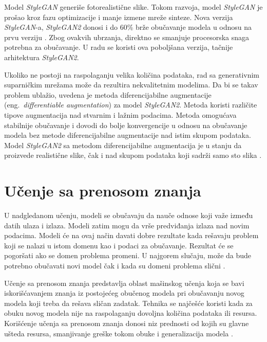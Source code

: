 \documentclass[12pt,oneside]{memoir}
\begin{document}
Model \textit{StyleGAN} generiše fotorealistične slike. Tokom razvoja, model \textit{StyleGAN} je prošao kroz fazu optimizacije i manje izmene mreže sinteze. Nova verzija \textit{StyleGAN}-a, \textit{StyleGAN2} donosi i do 60\% brže obučavanje modela u odnosu na prvu verziju \cite{karras2020analyzing}. Zbog ovakvih ubrzanja, direktno se smanjuje procesorska snaga potrebna za obučavanje. U radu se koristi ova poboljšana verzija, tačnije arhitektura \textit{StyleGAN2}.

Ukoliko ne postoji na raspolaganju velika količina podataka, rad sa generativnim suparničkim mrežama može da rezultira nekvalitetnim modelima.
Da bi se takav problem ublažio, uvedena je metoda diferencijabilne augmentacije (eng.~\textit{differentiable augmentation}) za model \textit{StyleGAN2}. Metoda koristi različite tipove augmentacija nad stvarnim i lažnim podacima. Metoda omogućava stabilnije obučavanje i dovodi do bolje konvergencije u odnosu na obučavanje modela bez metode diferencijabilne augmentacije nad istim skupom podataka. Model \textit{StyleGAN2} sa metodom diferencijabilne augmentacija je u stanju da proizvede realistične slike, čak i nad skupom podataka koji sadrži samo sto slika \cite{zhao2020differentiable}.


\section{Učenje sa prenosom znanja}
\label{section3_trasnferucenje}
U nadgledanom učenju, modeli se obučavaju da nauče odnose koji važe između datih ulaza i izlaza. Modeli zatim mogu da vrše predviđanja izlaza nad novim podacima. Modeli će na ovaj način davati dobre rezultate kada rešavaju problem koji se nalazi u istom domenu kao i podaci za obučavanje. Rezultat će se pogoršati ako se domen problema promeni. U najgorem slučaju, može da bude potrebno obučavati novi model čak i kada su domeni problema slični \cite{zhuang2020comprehensive}.

Učenje sa prenosom znanja predstavlja oblast mašinskog učenja koja se bavi iskorišćavanjem znanja iz postojećeg obučenog modela pri obučavanju novog modela koji treba da rešava sličan zadatak. Tehnika se najčešće koristi kada za obuku novog modela nije na raspolaganju dovoljna količina podataka ili resursa. Korišćenje učenja sa prenosom znanja donosi niz prednosti od kojih su glavne ušteda resursa, smanjivanje greške tokom obuke i generalizacija modela \cite{zhuang2020comprehensive}.
\end{document}
